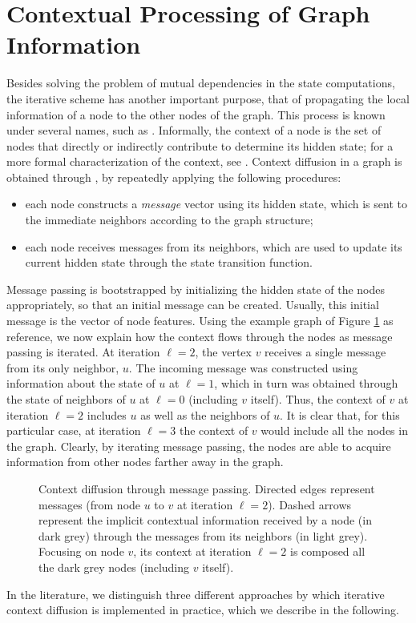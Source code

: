\section{Contextual Processing of Graph Information}
Besides solving the problem of mutual dependencies in the state computations, the iterative scheme has another important purpose, that of propagating the local information of a node to the other nodes of the graph. This process is known under several names, such as . Informally, the context of a node is the set of nodes that directly or indirectly contribute to determine its hidden state; for a more formal characterization of the context, see \cite{?}. Context diffusion in a graph is obtained through , \ie by repeatedly applying the following procedures:
\begin{itemize}
    \item each node constructs a \emph{message} vector using its hidden state, which is sent to the immediate neighbors according to the graph structure;
    \item each node receives messages from its neighbors, which are used to update its current hidden state through the state transition function.
\end{itemize}
Message passing is bootstrapped by initializing the hidden state of the nodes appropriately, so that an initial message can be created. Usually, this initial message is the vector of node features. Using the example graph of Figure \ref{fig:context-diffusion} as reference, we now explain how the context flows through the nodes as message passing is iterated. At iteration $\ell=2$, the vertex $v$ receives a single message from its only neighbor, $u$. The incoming message was constructed using information about the state of $u$ at $\ell=1$, which in turn was obtained through the state of neighbors of $u$ at $\ell=0$ (including $v$ itself). Thus, the context of $v$ at iteration $\ell=2$ includes $u$ as well as the neighbors of $u$. It is clear that, for this particular case, at iteration $\ell=3$ the context of $v$ would include all the nodes in the graph. Clearly, by iterating message passing, the nodes are able to acquire information from other nodes farther away in the graph.
\begin{figure}[h!]
    \centering
    \resizebox{.8\textwidth}{!}{}
    \caption{Context diffusion through message passing. Directed edges represent messages (\eg from node $u$ to $v$ at iteration $\ell=2$). Dashed arrows represent the implicit contextual information received by a node (in dark grey) through the messages from its neighbors (in light grey). Focusing on node $v$, its context at iteration $\ell=2$ is composed all the dark grey nodes (including $v$ itself).}
    \label{fig:context-diffusion}
\end{figure}
In the literature, we distinguish three different approaches by which iterative context diffusion is implemented in practice, which we describe in the following.

